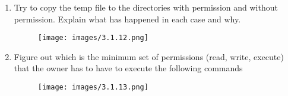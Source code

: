 \documentclass[12pt, titlepage,]{article}
\begin{document}
\begin{enumerate}
\item  Try to copy the temp file to the directories with permission and without permission. Explain what has happened in each case and why.
\begin{figure}[h] %
    \centering
    \texttt{[image: images/3.1.12.png]}
\end{figure}


\item Figure out which is the minimum set of permissions (read, write, execute) that the owner has to have to execute the following commands
\begin{figure}[h] %
    \centering
    \texttt{[image: images/3.1.13.png]}
\end{figure}
\end{enumerate}
\end{document}

